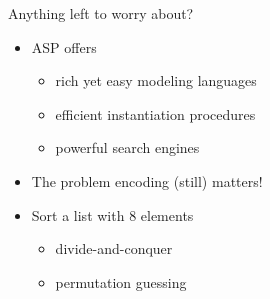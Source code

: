 \begin{frame}[c]{Anything left to worry about?}
  \begin{itemize}
  \item ASP offers
    \begin{itemize}
    \item rich yet easy modeling languages
    \item efficient instantiation procedures
    \item powerful search engines
    \end{itemize}
    \bigskip
  \item<2->  The problem encoding (still) matters!
    \bigskip
  \item<3-> 
    \medskip
    Sort a list with 8 elements
    \begin{itemize}
    \item divide-and-conquer %
      \hfill{}
    \item permutation guessing
      \hfill{}
    \end{itemize}
  \end{itemize}
\end{frame}

